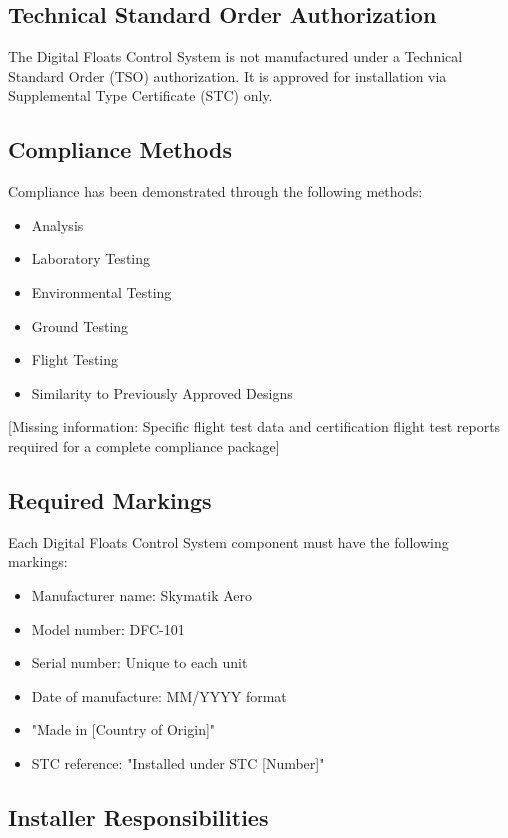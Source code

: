 \documentclass[12pt,a4paper,twoside,openright]{book}
\begin{document}
\subsection{Technical Standard Order Authorization}

The Digital Floats Control System is not manufactured under a Technical Standard Order (TSO) authorization. It is approved for installation via Supplemental Type Certificate (STC) only.

\subsection{Compliance Methods}

Compliance has been demonstrated through the following methods:

\begin{itemize}
    \item Analysis
    \item Laboratory Testing
    \item Environmental Testing
    \item Ground Testing
    \item Flight Testing
    \item Similarity to Previously Approved Designs
\end{itemize}

{\color{missingred}[Missing information: Specific flight test data and certification flight test reports required for a complete compliance package]}

\subsection{Required Markings}

Each Digital Floats Control System component must have the following markings:

\begin{itemize}
    \item Manufacturer name: Skymatik Aero
    \item Model number: DFC-101
    \item Serial number: Unique to each unit
    \item Date of manufacture: MM/YYYY format
    \item "Made in [Country of Origin]"
    \item STC reference: "Installed under STC [Number]"
\end{itemize}

\subsection{Installer Responsibilities}
\end{document}
